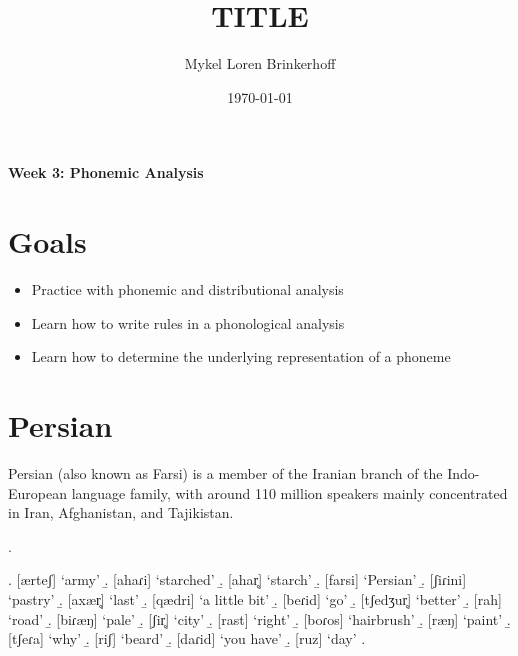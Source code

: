 \documentclass[12pt, letterpaper]{article}
\title{TITLE}
\author{Mykel Loren Brinkerhoff}
\date{\today}
\begin{document}


\begin{center}
     {\Large \textbf{Week 3: Phonemic Analysis}}
     \vspace{6pt}
\end{center}
\thispagestyle{fancy}

\section*{Goals} \label{sec:Goals}

\begin{itemize}
    \item Practice with phonemic and distributional analysis
    \item Learn how to write rules in a phonological analysis
    \item Learn how to determine the underlying representation of a phoneme
\end{itemize}

\section*{Persian} \label{sec:persian}

Persian (also known as Farsi) is a member of the Iranian branch of the Indo-European language family, with around 110 million speakers mainly concentrated in Iran, Afghanistan, and Tajikistan.

\ex. 
\begin{multicols}{3}
    \a. {}[ærteʃ] `army' 
    \b. {}[ahaɾi] `starched'
    \b. {}[ahar̥] `starch'
    \b. {}[farsi] `Persian'
    \b. {}[ʃiɾini] `pastry'
    \b. {}[axær̥] `last'
    \b. {}[qædri] `a little bit'
    \b. {}[beɾid] `go'
    \b. {}[tʃedʒur̥] `better'
    \b. {}[rah] `road'
    \b. {}[biɾæŋ] `pale'
    \b. {}[ʃir̥] `city'
    \b. {}[rast] `right'
    \b. {}[boɾos] `hairbrush'
    \b. {}[ræŋ] `paint'
    \b. {}[tʃeɾa] `why'
    \b. {}[riʃ] `beard'
    \b. {}[daɾid] `you have'
    \b. {}[ruz] `day'
    \z. 
\end{multicols}
    
\end{document}

